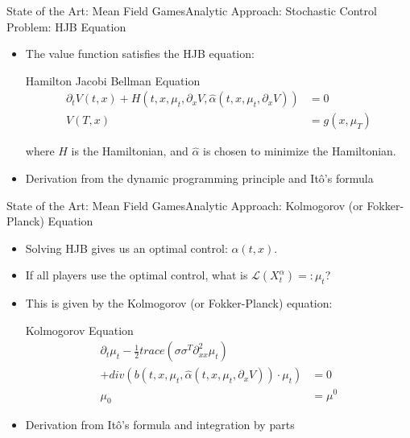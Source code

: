 \documentclass{beamer}
\begin{document}
\begin{frame}{State of the Art: Mean Field Games}{Analytic Approach: Stochastic Control Problem: HJB Equation}
	\begin{itemize}
				\item {
					The value function satisfies the HJB equation:
					\begin{block}{Hamilton Jacobi Bellman Equation}
						\begin{equation}
						\begin{split}
						\partial_tV(t,x)+ H(t,x, \mu_t,\partial_x V,\hat{\alpha}(t,x,\mu_t, \partial_x V))&=0 \\
						V(T,x)&=g(x,\mu_T)
						\end{split}
						\end{equation}
					\end{block}
					where  $H$ is the Hamiltonian, and $\hat{\alpha}$ is chosen to minimize the Hamiltonian.
				}
				\item {
					Derivation from the dynamic programming principle and It\^{o}'s formula
				}
			\end{itemize}
\end{frame}
		
\begin{frame}{State of the Art: Mean Field Games}{Analytic Approach: Kolmogorov (or Fokker-Planck) Equation}
	\begin{itemize}
				\item {
					Solving HJB gives us an optimal control: $\alpha(t,x)$.
				}
				\item {
					If all players use the optimal control, what is $\mathcal{L}(X_t^{\alpha})=:\mu_t$?
				}
				\item {
					This is given by the Kolmogorov (or Fokker-Planck) equation:
					\begin{block}{Kolmogorov Equation}
						\begin{equation}
						\begin{split}
						\partial_t \mu_t-\frac{1}{2} trace(\sigma \sigma^T \partial_{xx}^2 \mu_t)& \\
						+ div(b(t,x, \mu_t,\hat{\alpha}(t,x,\mu_t, \partial_x V))\cdot \mu_t)&=0 \\
						\mu_0&= \mu^0   
						\end{split}
						\end{equation}
					\end{block}
				}
				\item {
					Derivation from It\^{o}'s formula and integration by parts
				}
			\end{itemize}
\end{frame}
		
\end{document}
